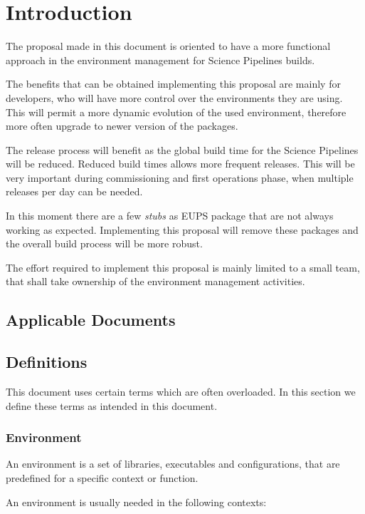 \section{Introduction} \label{sec:intro}

The proposal made in this document is oriented to have a more functional approach in the environment management for Science Pipelines builds.

The benefits that can be obtained implementing this proposal are mainly for developers, who will have more control over the environments they are using. 
This will permit a more dynamic evolution of the used environment, therefore more often upgrade to newer version of the packages. 

The release process will  benefit as the global build time for the Science Pipelines  will be reduced. 
Reduced build times allows more frequent releases. 
This will be very important during commissioning and first operations phase, when multiple releases per day can be needed.

In this moment there are a few \textit{stubs} as EUPS package that are not always working as expected.
Implementing this proposal will remove these packages and the overall build process will be more robust.

The effort required to implement this proposal is mainly limited to a small team, that shall take ownership of the environment management activities.


\subsection{Applicable Documents}


\subsection{Definitions}

This document uses certain terms which are often overloaded. In this section we define these terms  as intended in this document.

\subsubsection{Environment} \label{sec:envdef}

An environment is a set of libraries, executables and configurations, that are predefined for a specific context or function.

An environment is usually needed in the following contexts:

